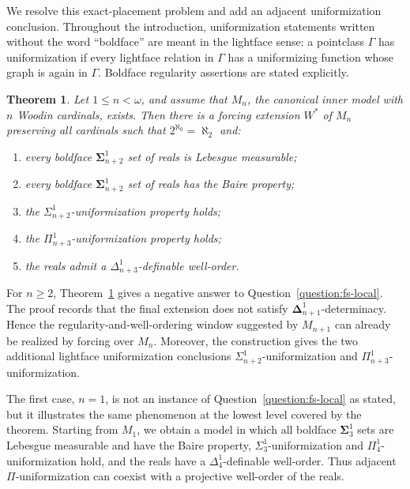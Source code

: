 \documentclass[a4paper,11pt]{article}
\newtheorem{theorem}{Theorem}[section]
\begin{document}
We resolve this exact-placement problem and add an adjacent uniformization
conclusion.  Throughout the introduction, uniformization statements written
without the word ``boldface'' are meant in the lightface sense: a pointclass
$\Gamma$ has uniformization if every lightface relation in $\Gamma$ has a
uniformizing function whose graph is again in $\Gamma$.  Boldface regularity
assertions are stated explicitly.

\begin{theorem}\label{thm:intro-main}
Let $1\leq n<\omega$, and assume that $M_n$, the canonical inner model with
$n$ Woodin cardinals, exists.  Then there is a forcing extension $W^\ast$ of
$M_n$ preserving all cardinals such that $2^{\aleph_0}=\aleph_2$ and:
\begin{enumerate}
   \item every boldface $\boldsymbol\Sigma^1_{n+2}$ set of reals is
   Lebesgue measurable;
   \item every boldface $\boldsymbol\Sigma^1_{n+2}$ set of reals has the
   Baire property;
   \item the $\Sigma^1_{n+2}$-uniformization property holds;
   \item the $\Pi^1_{n+3}$-uniformization property holds;
   \item the reals admit a $\Delta^1_{n+3}$-definable well-order.
\end{enumerate}
\end{theorem}

For $n\geq 2$, Theorem~\ref{thm:intro-main} gives a negative answer to
Question~\ref{question:fs-local}.  The proof records that the final extension
does not satisfy $\boldsymbol\Delta^1_{n+1}$-determinacy.  Hence the
regularity-and-well-ordering window suggested by $M_{n+1}$ can already be
realized by forcing over $M_n$.  Moreover, the construction gives the two
additional lightface uniformization conclusions
$\Sigma^1_{n+2}$-uniformization and $\Pi^1_{n+3}$-uniformization.

The first case, $n=1$, is not an instance of
Question~\ref{question:fs-local} as stated, but it illustrates the same
phenomenon at the lowest level covered by the theorem.  Starting from $M_1$,
we obtain a model in which all boldface $\boldsymbol\Sigma^1_3$ sets are
Lebesgue measurable and have the Baire property,
$\Sigma^1_3$-uniformization and $\Pi^1_4$-uniformization hold, and the reals
have a $\Delta^1_4$-definable well-order.  Thus adjacent
$\Pi$-uniformization can coexist with a projective well-order of the reals.
\end{document}
